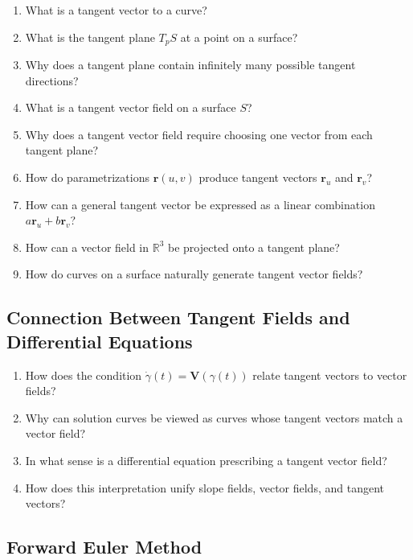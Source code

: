 \begin{enumerate}[resume]
  \item What is a tangent vector to a curve?
  \item What is the tangent plane $T_p S$ at a point on a surface?
  \item Why does a tangent plane contain infinitely many possible tangent directions?
  \item What is a tangent vector field on a surface $S$?
  \item Why does a tangent vector field require choosing one vector from each tangent plane?
  \item How do parametrizations $\mathbf{r}(u,v)$ produce tangent vectors $\mathbf{r}_u$ and $\mathbf{r}_v$?
  \item How can a general tangent vector be expressed as a linear combination $a\mathbf{r}_u + b\mathbf{r}_v$?
  \item How can a vector field in $\mathbb{R}^3$ be projected onto a tangent plane?
  \item How do curves on a surface naturally generate tangent vector fields?
\end{enumerate}

\subsection{Connection Between Tangent Fields and Differential Equations}

\begin{enumerate}[resume]
  \item How does the condition $\dot{\gamma}(t) = \mathbf{V}(\gamma(t))$ relate tangent vectors to vector fields?
  \item Why can solution curves be viewed as curves whose tangent vectors match a vector field?
  \item In what sense is a differential equation prescribing a tangent vector field?
  \item How does this interpretation unify slope fields, vector fields, and tangent vectors?
\end{enumerate}

\subsection{Forward Euler Method}

